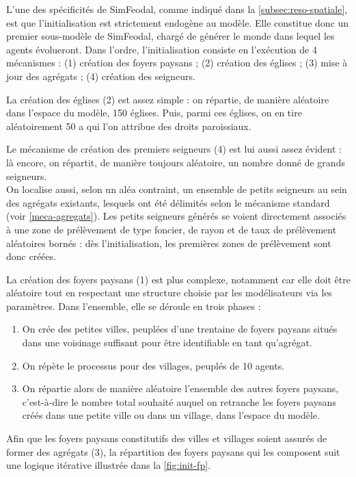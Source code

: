 L'une des spécificités de SimFeodal, comme indiqué dans la \cref{subsec:reso-spatiale}, est que l'initialisation est strictement endogène au modèle.
Elle constitue donc un premier \og sous-modèle\fg{} de SimFeodal, chargé de générer le monde dans lequel les agents évolueront.
Dans l'ordre, l'initialisation consiste en l'exécution de 4 mécanismes : (1) création des foyers paysans ; (2) création des églises ; (3) mise à jour des agrégats ; (4) création des seigneurs.

La création des églises (2) est assez simple : on répartie, de manière aléatoire dans l'espace du modèle, 150\unskip{} églises.
Puis, parmi ces églises, on en tire aléatoirement 50 a qui l'on attribue des droits paroissiaux.

Le mécanisme de création des premiers seigneurs (4) est lui aussi assez évident : là encore, on répartit, de manière toujours aléatoire, un nombre donné de grands seigneurs.\\
On localise aussi, selon un aléa contraint, un ensemble de petits seigneurs au sein des agrégats existants, lesquels ont été délimités selon le mécanisme standard (voir \cref{meca-agregats}).
Les petits seigneurs générés se voient directement associés à une zone de prélèvement de type \og foncier\fg{}, de rayon et de taux de prélèvement aléatoires bornés : dès l'initialisation, les premières zones de prélèvement sont donc créées.

La création des foyers paysans (1) est plus complexe, notamment car elle doit être aléatoire tout en respectant une structure choisie par les modélisateurs via les paramètres.
Dans l'ensemble, elle se déroule en trois phases :
\begin{enumerate}
	\item On crée des \og petites villes\fg{}, peuplées d'une trentaine de foyers paysans situés dans une voisinage suffisant pour être identifiable en tant qu'agrégat.
	\item On répète le processus pour des \og villages\fg{}, peuplés de 10 agents.
	\item On répartie alors de manière aléatoire l'ensemble des autres foyers paysans, c'est-à-dire le nombre total souhaité auquel on retranche les foyers paysans créés dans une petite ville ou dans un village, dans l'espace du modèle.
\end{enumerate}
Afin que les foyers paysans constitutifs des villes et villages soient assurés de former des agrégats (3), la répartition des foyers paysans qui les composent suit une logique itérative illustrée dans la \cref{fig:init-fp}.


